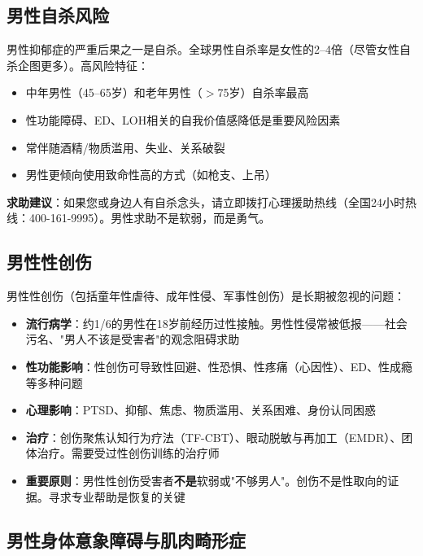 \documentclass[12pt,a4paper,twoside]{ctexbook}
\begin{document}
\subsection{男性自杀风险}

男性抑郁症的严重后果之一是自杀。全球男性自杀率是女性的2--4倍（尽管女性自杀企图更多）。高风险特征：

\begin{itemize}[leftmargin=2cm]
	\item 中年男性（45--65岁）和老年男性（$>$75岁）自杀率最高
	\item 性功能障碍、ED、LOH相关的自我价值感降低是重要风险因素
	\item 常伴随酒精/物质滥用、失业、关系破裂
	\item 男性更倾向使用致命性高的方式（如枪支、上吊）
\end{itemize}

\textbf{求助建议}：如果您或身边人有自杀念头，请立即拨打心理援助热线（全国24小时热线：400-161-9995）。男性求助不是软弱，而是勇气。

\subsection{男性性创伤}

男性性创伤（包括童年性虐待、成年性侵、军事性创伤）是长期被忽视的问题：

\begin{itemize}[leftmargin=2cm]
	\item \textbf{流行病学}：约1/6的男性在18岁前经历过性接触。男性性侵常被低报——社会污名、"男人不该是受害者"的观念阻碍求助
	\item \textbf{性功能影响}：性创伤可导致性回避、性恐惧、性疼痛（心因性）、ED、性成瘾等多种问题
	\item \textbf{心理影响}：PTSD、抑郁、焦虑、物质滥用、关系困难、身份认同困惑
	\item \textbf{治疗}：创伤聚焦认知行为疗法（TF-CBT）、眼动脱敏与再加工（EMDR）、团体治疗。需要受过性创伤训练的治疗师
	\item \textbf{重要原则}：男性性创伤受害者\textbf{不是}软弱或"不够男人"。创伤不是性取向的证据。寻求专业帮助是恢复的关键
\end{itemize}

\subsection{男性身体意象障碍与肌肉畸形症}
\label{subsec:muscle_dysmorphia}
\end{document}
